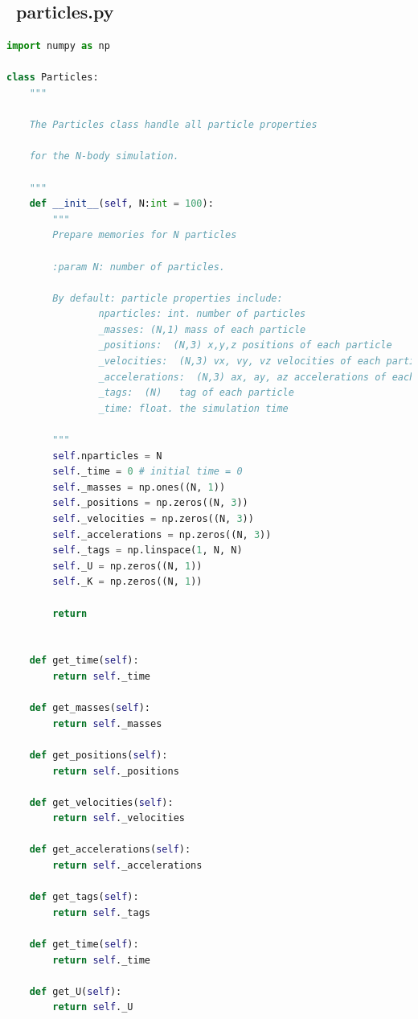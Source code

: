 \documentclass[12pt]{article}
\begin{document}
    \subsection{{\ttfamily\ particles.py}}
        \begin{lstlisting}[language={Python}]
import numpy as np

class Particles:
    """
    
    The Particles class handle all particle properties

    for the N-body simulation. 

    """
    def __init__(self, N:int = 100):
        """
        Prepare memories for N particles

        :param N: number of particles.

        By default: particle properties include:
                nparticles: int. number of particles
                _masses: (N,1) mass of each particle
                _positions:  (N,3) x,y,z positions of each particle
                _velocities:  (N,3) vx, vy, vz velocities of each particle
                _accelerations:  (N,3) ax, ay, az accelerations of each partciel
                _tags:  (N)   tag of each particle
                _time: float. the simulation time 

        """
        self.nparticles = N
        self._time = 0 # initial time = 0
        self._masses = np.ones((N, 1))
        self._positions = np.zeros((N, 3))
        self._velocities = np.zeros((N, 3))
        self._accelerations = np.zeros((N, 3))
        self._tags = np.linspace(1, N, N)
        self._U = np.zeros((N, 1))
        self._K = np.zeros((N, 1))
        
        return


    def get_time(self):
        return self._time
    
    def get_masses(self):
        return self._masses
    
    def get_positions(self):
        return self._positions
    
    def get_velocities(self):
        return self._velocities
    
    def get_accelerations(self):
        return self._accelerations
    
    def get_tags(self):
        return self._tags
    
    def get_time(self):
        return self._time
    
    def get_U(self):
        return self._U
    

\end{lstlisting}
\end{document}
